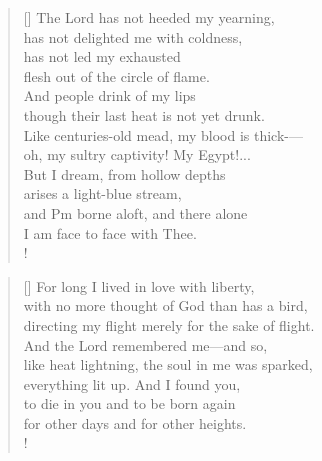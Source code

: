 \documentclass[]{article}
\begin{document}
\settowidth{\versewidth}{The Lord has not heeded my yearning }
\begin{verse}[\versewidth]
The Lord has not heeded my yearning,\\
has not delighted me with coldness,\\
has not led my exhausted\\
flesh out of the circle of flame.\\
And people drink of my lips\\
though their last heat is not yet drunk.\\
Like centuries-old mead, my blood is thick-— \\
oh, my sultry captivity! My Egypt!... \\
But I dream, from hollow depths\\
arises a light-blue stream,\\
and Pm borne aloft, and there alone\\
I am face to face with Thee.\\!
\end{verse}
\bigskip \bigskip

\settowidth{\versewidth}{For long I lived in love with liberty,       }
\begin{verse}[\versewidth]
For long I lived in love with liberty,\\
with no more thought of God than has a bird,\\
directing my flight merely for the sake of flight.\\
And the Lord remembered me—and so,\\
like heat lightning, the soul in me was sparked,\\
everything lit up. And I found you,\\
to die in you and to be born again\\
for other days and for other heights.\\!
\end{verse}
\bigskip \bigskip
\end{document}
